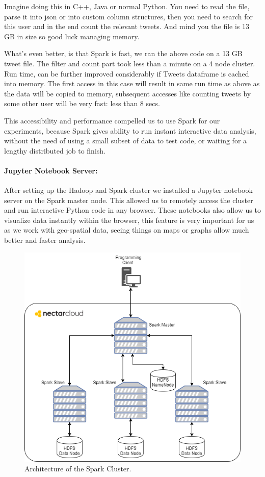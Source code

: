\documentclass[12pt]{report}
\theoremstyle{named}
\begin{document}
\inputminted{python}{sparkCount.py}

Imagine doing this in C++, Java or normal Python. You need to read the file, parse it into json or into custom column structures, then you need to search for this user and in the end count the relevant tweets. And mind you the file is 13 GB in size so good luck managing memory.

What's even better, is that Spark is fast, we ran the above code on a 13 GB tweet file. The filter and count part took less than a minute on a 4 node cluster. Run time, can be further improved considerably if Tweets dataframe is cached into memory. The first access in this case will result in same run time as above as the data will be copied to memory, subsequent accesses like counting tweets by some other user will be very fast: less than 8 secs.

This accessibility and performance compelled us to use Spark for our experiments, because Spark gives ability to run instant interactive data analysis, without the need of using a small subset of data to test code, or waiting for a lengthy distributed job to finish.


\paragraph{Jupyter Notebook Server:\\}
After setting up the Hadoop and Spark cluster we installed a Jupyter notebook server on the Spark master node. This allowed us to remotely access the cluster and run interactive Python code in any browser. These notebooks also allow us to visualize data instantly within the browser, this feature is very important for us as we work with geo-spatial data, seeing things on maps or graphs allow much better and faster analysis.
\begin{figure}[ht]
\centering
        \includegraphics[width=120mm,scale=1]{Images/Spark.png}
    \caption{Architecture of the Spark Cluster.}
    \label{fig:sparkCluster}
\end{figure}
\end{document}
